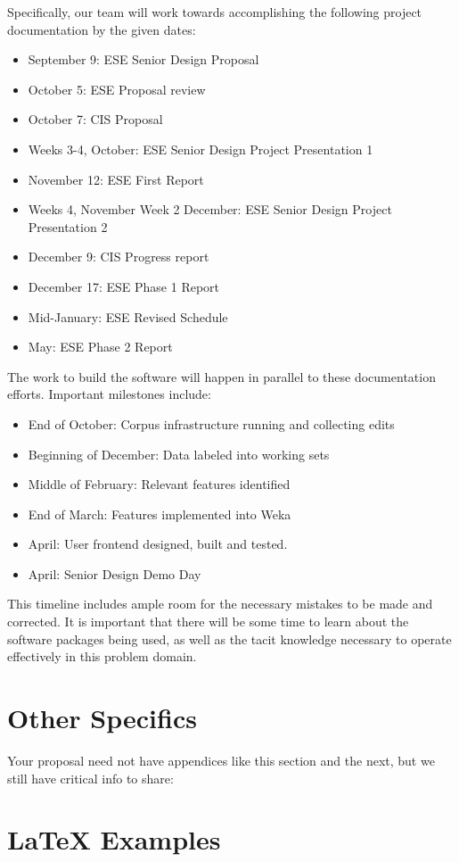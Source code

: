 \documentclass[letterpaper]{sig-alternate}
\begin{document}
Specifically, our team will work towards accomplishing the following project documentation by the given dates:
\begin{itemize}
\item September 9: ESE Senior Design Proposal
\item October 5: ESE Proposal review
\item October 7: CIS Proposal
\item Weeks 3-4, October: ESE Senior Design Project Presentation 1
\item November 12: ESE First Report
\item Weeks 4, November Week 2 December: ESE Senior Design Project Presentation 2
\item December 9: CIS  Progress report 
\item December 17: ESE Phase 1 Report
\item Mid-January: ESE Revised Schedule
\item May: ESE Phase 2 Report
\end{itemize}

The work to build the software will happen in parallel to these documentation efforts. Important milestones include:

\begin{itemize}
\item End of October: Corpus infrastructure running and collecting edits
\item Beginning of December: Data labeled into working sets
\item Middle of February: Relevant features identified
\item End of March: Features implemented into Weka
\item April: User frontend designed, built and tested.
\item April: Senior Design Demo Day
\end{itemize}
This timeline includes ample room for the necessary mistakes to be made and corrected. It is important that there will be some time to learn about the software packages being used, as well as the tacit knowledge necessary to operate effectively in this problem domain.



\vspace{150pt}

\appendix
\section{Other Specifics}
\label{app:other_specifics}
Your proposal need not have appendices like this section and the next, but we still have critical info to share:


\section{\LaTeX{} Examples}
\label{app:latex_examples}
\end{document}

